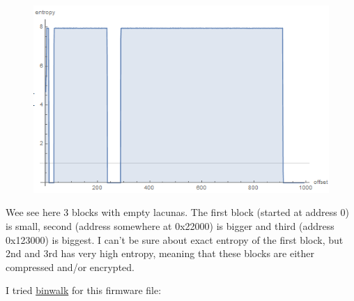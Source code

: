 \begin{figure}[H]
\centering
\includegraphics[scale=\FigScale]{ff/entropy/tplink.png}
\end{figure}

Wee see here 3 blocks with empty lacunas.
The first block (started at address 0) is small, second (address somewhere at 0x22000) is bigger and third (address 0x123000) is biggest.
I can't be sure about exact entropy of the first block, but 2nd and 3rd has very high entropy, meaning that these blocks are either
compressed and/or encrypted.

I tried \href{http://binwalk.org/}{binwalk} for this firmware file:

